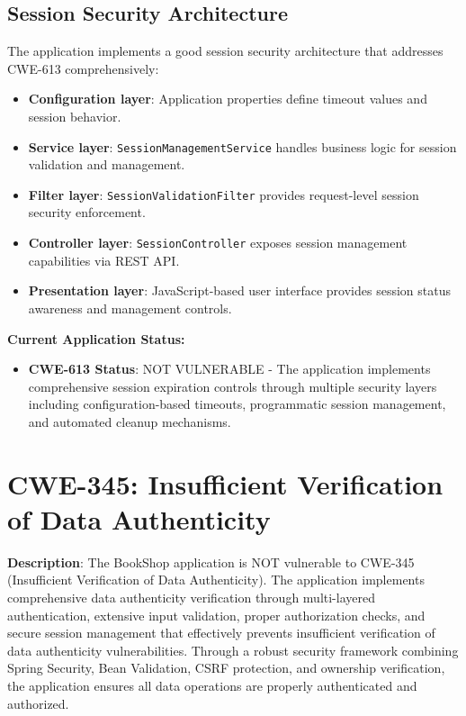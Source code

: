 \documentclass[]{UCD_CS_FYP_Report}
\begin{document}
\subsection{Session Security Architecture}
The application implements a good session security architecture that addresses CWE-613 comprehensively:
\begin{itemize}
	\item \textbf{Configuration layer}: Application properties define timeout values and session behavior.
	\item \textbf{Service layer}: \texttt{SessionManagementService} handles business logic for session validation and management.
	\item \textbf{Filter layer}: \texttt{SessionValidationFilter} provides request-level session security enforcement.
	\item \textbf{Controller layer}: \texttt{SessionController} exposes session management capabilities via REST API.
	\item \textbf{Presentation layer}: JavaScript-based user interface provides session status awareness and management controls.
\end{itemize}

\textbf{Current Application Status:}
\begin{itemize}
	\item \textbf{CWE-613 Status}: NOT VULNERABLE - The application implements comprehensive session expiration controls through multiple security layers including configuration-based timeouts, programmatic session management, and automated cleanup mechanisms.
\end{itemize}

\section{CWE-345: Insufficient Verification of Data Authenticity}

\textbf{Description}: The BookShop application is NOT vulnerable to CWE-345 (Insufficient Verification of Data Authenticity). The application implements comprehensive data authenticity verification through multi-layered authentication, extensive input validation, proper authorization checks, and secure session management that effectively prevents insufficient verification of data authenticity vulnerabilities. Through a robust security framework combining Spring Security, Bean Validation, CSRF protection, and ownership verification, the application ensures all data operations are properly authenticated and authorized.
\end{document}

